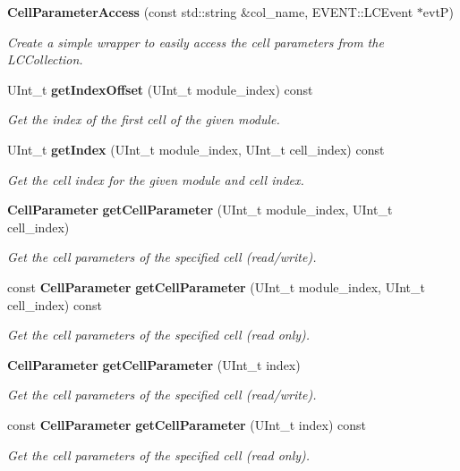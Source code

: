 \begin{DoxyCompactItemize}
\item 
{\bf Cell\-Parameter\-Access} (const std\-::string \&col\-\_\-name, E\-V\-E\-N\-T\-::\-L\-C\-Event $\ast$evt\-P)
\begin{DoxyCompactList}\small\item\em Create a simple wrapper to easily access the cell parameters from the L\-C\-Collection. \end{DoxyCompactList}\item 
U\-Int\-\_\-t {\bf get\-Index\-Offset} (U\-Int\-\_\-t module\-\_\-index) const 
\begin{DoxyCompactList}\small\item\em Get the index of the first cell of the given module. \end{DoxyCompactList}\item 
U\-Int\-\_\-t {\bf get\-Index} (U\-Int\-\_\-t module\-\_\-index, U\-Int\-\_\-t cell\-\_\-index) const 
\begin{DoxyCompactList}\small\item\em Get the cell index for the given module and cell index. \end{DoxyCompactList}\item 
{\bf Cell\-Parameter} {\bf get\-Cell\-Parameter} (U\-Int\-\_\-t module\-\_\-index, U\-Int\-\_\-t cell\-\_\-index)
\begin{DoxyCompactList}\small\item\em Get the cell parameters of the specified cell (read/write). \end{DoxyCompactList}\item 
const {\bf Cell\-Parameter} {\bf get\-Cell\-Parameter} (U\-Int\-\_\-t module\-\_\-index, U\-Int\-\_\-t cell\-\_\-index) const 
\begin{DoxyCompactList}\small\item\em Get the cell parameters of the specified cell (read only). \end{DoxyCompactList}\item 
{\bf Cell\-Parameter} {\bf get\-Cell\-Parameter} (U\-Int\-\_\-t index)
\begin{DoxyCompactList}\small\item\em Get the cell parameters of the specified cell (read/write). \end{DoxyCompactList}\item 
const {\bf Cell\-Parameter} {\bf get\-Cell\-Parameter} (U\-Int\-\_\-t index) const 
\begin{DoxyCompactList}\small\item\em Get the cell parameters of the specified cell (read only). \end{DoxyCompactList}\end{DoxyCompactItemize}
